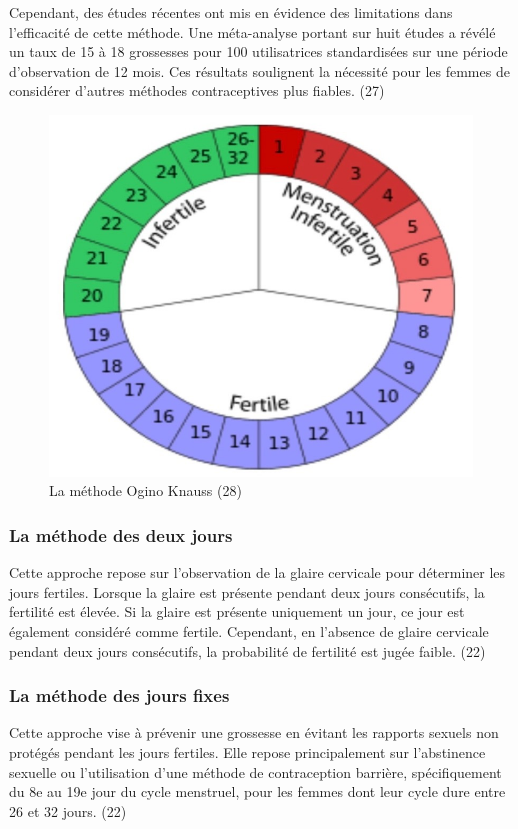 \noindent Cependant, des études récentes ont mis en évidence des limitations dans l'efficacité de cette méthode. Une méta-analyse portant sur huit études a révélé un taux de 15 à 18 grossesses pour 100 utilisatrices standardisées sur une période d'observation de 12 mois. Ces résultats soulignent la nécessité pour les femmes de considérer d'autres méthodes contraceptives plus fiables. (27) \\

\begin{figure}[H]
  \begin{center}
    \includegraphics[scale=.8]{Images/fig_12.jpg}
    \caption{La méthode Ogino Knauss (28)}
  \end{center}
\end{figure}

\subsubsection{La méthode des deux jours}
Cette approche repose sur l'observation de la glaire cervicale pour déterminer les jours fertiles. Lorsque la glaire est présente pendant deux jours consécutifs, la fertilité est élevée. Si la glaire est présente uniquement un jour, ce jour est également considéré comme fertile. Cependant, en l'absence de glaire cervicale pendant deux jours consécutifs, la probabilité de fertilité est jugée faible. (22)\\

\subsubsection{La méthode des jours fixes}
Cette approche vise à prévenir une grossesse en évitant les rapports sexuels non protégés pendant les jours fertiles. Elle repose principalement sur l'abstinence sexuelle ou l'utilisation d'une méthode de contraception barrière, spécifiquement du 8e au 19e jour du cycle menstruel, pour les femmes dont leur cycle dure entre 26 et 32 jours. (22) 

